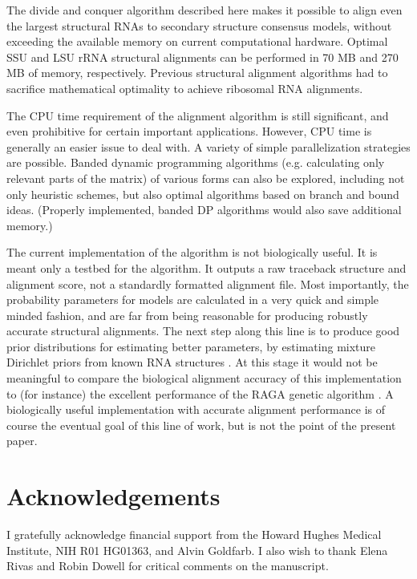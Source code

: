 \documentclass[11pt]{article}
\begin{document}
The divide and conquer algorithm described here makes it possible to
align even the largest structural RNAs to secondary structure
consensus models, without exceeding the available memory on current
computational hardware. Optimal SSU and LSU rRNA structural alignments
can be performed in 70 MB and 270 MB of memory, respectively. Previous
structural alignment algorithms had to sacrifice mathematical
optimality to achieve ribosomal RNA alignments.

The CPU time requirement of the alignment algorithm is still
significant, and even prohibitive for certain important
applications. However, CPU time is generally an easier issue to deal
with. A variety of simple parallelization strategies are
possible. Banded dynamic programming algorithms (e.g. calculating only
relevant parts of the matrix) of various forms can also be explored,
including not only heuristic schemes, but also optimal algorithms
based on branch and bound ideas. (Properly implemented, banded DP
algorithms would also save additional memory.)

The current implementation of the algorithm is not biologically
useful. It is meant only a testbed for the algorithm. It outputs a raw
traceback structure and alignment score, not a standardly formatted
alignment file. Most importantly, the probability parameters for
models are calculated in a very quick and simple minded fashion, and
are far from being reasonable for producing robustly accurate
structural alignments. The next step along this line is to produce
good prior distributions for estimating better parameters, by
estimating mixture Dirichlet priors from known RNA structures
\cite{Sjolander96}.  At this stage it would not be meaningful to
compare the biological alignment accuracy of this implementation to
(for instance) the excellent performance of the RAGA genetic algorithm
\cite{Notredame97}.  A biologically useful implementation with
accurate alignment performance is of course the eventual goal of this
line of work, but is not the point of the present paper.

\section{Acknowledgements}

I gratefully acknowledge financial support from the Howard Hughes
Medical Institute, NIH R01 HG01363, and Alvin Goldfarb. I also wish to
thank Elena Rivas and Robin Dowell for critical comments on the
manuscript.
\end{document}
